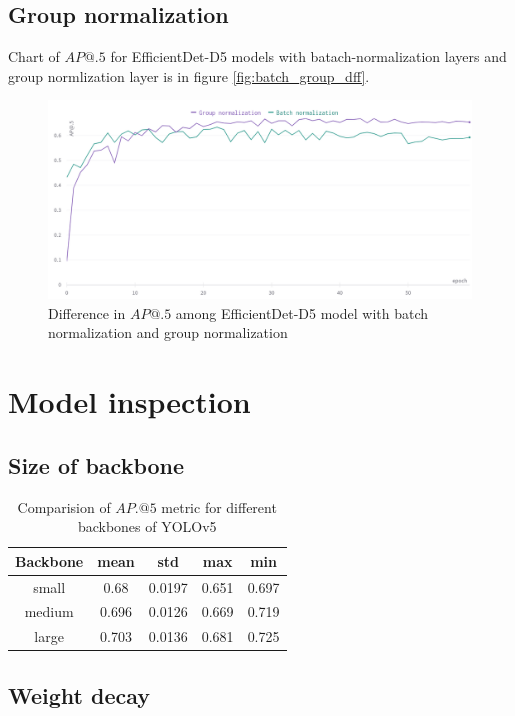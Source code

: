 \subsection{Group normalization}
Chart of $AP@.5$ for EfficientDet-D5 models with batach-normalization layers and group normlization layer is in figure \ref{fig:batch_group_dff}.
\begin{figure}[H]
    \centering
    \includegraphics[width=\textwidth]{images/batch_norm_group_norm.png}
    \caption{Difference in $AP@.5$ among EfficientDet-D5 model with batch normalization and group normalization}
    \label{fig:batch_group_diff}
\end{figure}

\section{Model inspection}
\subsection{Size of backbone}
\begin{table}[H]
    \begin{tabular}{|c|c|c|c|c|}
        \hline
        Backbone & mean  & std    & max   & min   \\ \hline
        small    & 0.68  & 0.0197 & 0.651 & 0.697 \\ \hline
        medium   & 0.696 & 0.0126 & 0.669 & 0.719 \\ \hline
        large    & 0.703 & 0.0136 & 0.681 & 0.725 \\ \hline
    \end{tabular}
    \caption{Comparision of $AP.@5$ metric for different backbones of YOLOv5}
    \label{tab:backbone_comparison}
\end{table}

\subsection{Weight decay}

